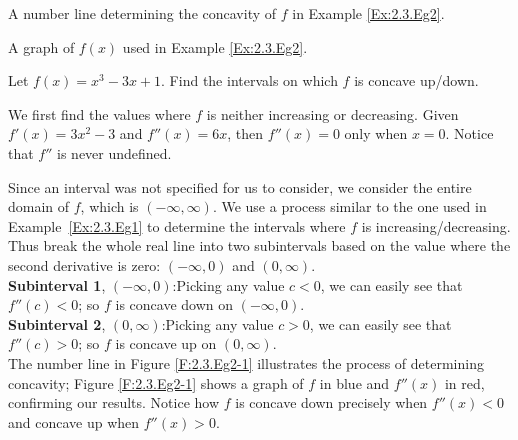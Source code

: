 \begin{marginfigure}[6cm]
\caption{A number line determining the concavity of $f$ in Example \ref{Ex:2.3.Eg2}.}\label{F:2.3.Eg2-1}
\end{marginfigure}

\begin{marginfigure}[1cm]
\caption{A graph of $f(x)$ used in Example \ref{Ex:2.3.Eg2}.}\label{F:2.3.Eg2-2}
\end{marginfigure}

\begin{example} \label{Ex:2.3.Eg2}
Let $f(x)=x^3-3x+1$. Find the intervals on which $f$ is concave up/down.

\solution We first find the values where $f$ is neither increasing or decreasing.  Given $f'(x)=3x^2-3$ and $f''(x)=6x$, then $f''(x) = 0$ only when $x=0$. Notice that $f''$ is never undefined.

Since an interval was not specified for us to consider, we consider the entire domain of $f$, which is $(-\infty,\infty)$. We use a process similar to the one used in Example~\ref{Ex:2.3.Eg1} to determine the intervals where $f$ is increasing/decreasing. Thus break the whole real line into two subintervals based on the value where the second derivative is zero: $(-\infty,0)$ and $(0,\infty)$. \\

\noindent\textbf{Subinterval 1}, $(-\infty,0)$:\quad Picking any value $c<0$, we can easily see that $f''(c)<0$; so $f$ is concave down on $(-\infty,0)$. \\

\noindent\textbf{Subinterval 2}, $(0, \infty)$:\quad  Picking any value $c>0$, we can easily see that $f''(c)>0$; so $f$ is concave up on $(0,\infty)$. \\

The number line in Figure \ref{F:2.3.Eg2-1} illustrates the process of determining concavity; Figure \ref{F:2.3.Eg2-1} shows a graph of $f$ in blue and $f''(x)$ in red, confirming our results. Notice how $f$ is concave down precisely when $f''(x)<0$ and concave up when $f''(x)>0$.
\end{example}